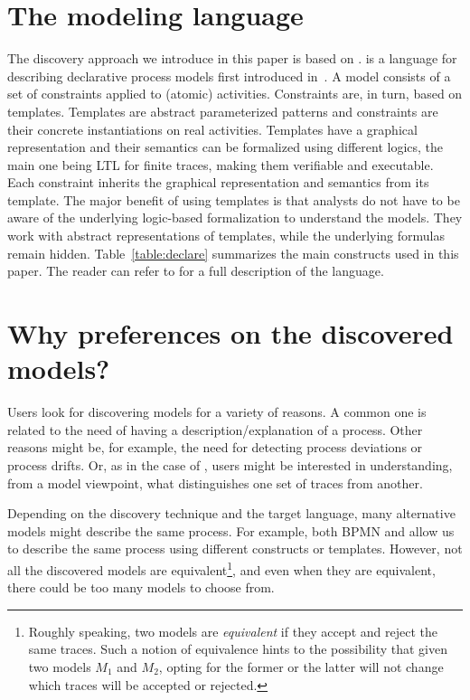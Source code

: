 
\section{The modeling language}
\label{sec:prel}
The discovery approach we introduce in this paper is based on \declare. \declare is a language for describing declarative process models first introduced
in~\cite{DBLP:conf/edoc/PesicSA07}. A \declare model consists of a set of constraints applied to
(atomic) activities. Constraints are, in turn, based on templates. Templates are
abstract parameterized patterns and constraints are their concrete
instantiations on real activities.
Templates have a graphical representation and their semantics can be formalized using different logics, the main one being  LTL for finite traces, making them verifiable and executable.
Each constraint inherits the graphical representation and semantics from its
template.
The major benefit of using templates is that analysts do not have to be aware of
the underlying logic-based formalization to understand the models. They work
with abstract representations of templates, while the underlying formulas
remain hidden. Table~\ref{table:declare} summarizes the main \declare constructs used in this paper. The reader can refer to \cite{DBLP:conf/edoc/PesicSA07} for a full description
of the language.





\section{Why preferences on the discovered models?}
\label{sec:example}


Users look for discovering models for a variety of reasons. A common one is related to the need of having a description/explanation of a process. Other reasons might be, for example, the need for detecting process deviations or process drifts. Or, as in the case of \nd,  users might be interested in understanding, from a model viewpoint, what distinguishes one set of traces from another. 

Depending on the discovery technique and the target language, many alternative models might describe the same process. For example, both BPMN and \declare allow us to describe the same process using different constructs or templates. However, not all the discovered models are equivalent\footnote{Roughly speaking, two models are \emph{equivalent} if they accept and reject the same traces. Such a notion of equivalence hints to the possibility that given two models $M_1$ and $M_2$, %
opting for the former or the latter will not change which traces will be accepted or rejected.}, and even when they are equivalent, there could be too many models to choose from.

